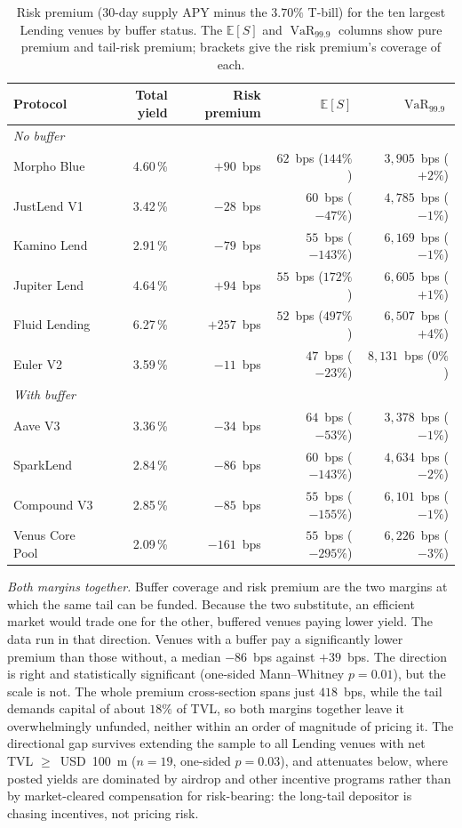 \documentclass[runningheads]{llncs}
\newcommand{\E}{\mathbb{E}}
\newcommand{\VaR}{\operatorname{VaR}}
\begin{document}
\begin{table}[tb]
\centering
\caption{Risk premium (30-day supply APY minus the $3.70\%$ T-bill) for
the ten largest Lending venues by buffer status. The $\E[S]$ and
$\VaR_{99.9}$ columns show pure premium and tail-risk premium; brackets
give the risk premium's coverage of each.}
\label{tab:yield-lending}
\small
\begin{tabular}{l r r r r}
\toprule
Protocol & Total yield & Risk premium & $\E[S]$ & $\VaR_{99.9}$ \\
\midrule
\multicolumn{5}{l}{\emph{No buffer}} \\
Morpho Blue   & 4.60\,\% & $+90$~bps  & $62$~bps ($144\%$)  & $3{,}905$~bps ($+2\%$) \\
JustLend V1   & 3.42\,\% & $-28$~bps  & $60$~bps ($-47\%$)  & $4{,}785$~bps ($-1\%$) \\
Kamino Lend   & 2.91\,\% & $-79$~bps  & $55$~bps ($-143\%$) & $6{,}169$~bps ($-1\%$) \\
Jupiter Lend  & 4.64\,\% & $+94$~bps  & $55$~bps ($172\%$)  & $6{,}605$~bps ($+1\%$) \\
Fluid Lending & 6.27\,\% & $+257$~bps & $52$~bps ($497\%$)  & $6{,}507$~bps ($+4\%$) \\
Euler V2      & 3.59\,\% & $-11$~bps  & $47$~bps ($-23\%$)  & $8{,}131$~bps ($0\%$) \\
\midrule
\multicolumn{5}{l}{\emph{With buffer}} \\
Aave V3         & 3.36\,\% & $-34$~bps  & $64$~bps ($-53\%$)  & $3{,}378$~bps ($-1\%$) \\
SparkLend       & 2.84\,\% & $-86$~bps  & $60$~bps ($-143\%$) & $4{,}634$~bps ($-2\%$) \\
Compound V3     & 2.85\,\% & $-85$~bps  & $55$~bps ($-155\%$) & $6{,}101$~bps ($-1\%$) \\
Venus Core Pool & 2.09\,\% & $-161$~bps & $55$~bps ($-295\%$) & $6{,}226$~bps ($-3\%$) \\
\bottomrule
\end{tabular}
\end{table}

\emph{Both margins together.} Buffer coverage and risk premium are the
two margins at which the same tail can be funded. Because the two
substitute, an efficient market would trade one for the other, buffered
venues paying lower yield. The data run in that direction. Venues with
a buffer pay a significantly lower premium than those without, a median
$-86$~bps against $+39$~bps. The direction is right and statistically
significant (one-sided Mann--Whitney $p=0.01$), but the scale is not.
The whole premium cross-section spans just $418$~bps, while the tail
demands capital of about $18\%$ of TVL, so both margins together leave
it overwhelmingly unfunded, neither within an order of magnitude of
pricing it. The directional gap survives extending the sample to all
Lending venues with net TVL $\ge$~USD~100~m ($n=19$, one-sided
$p=0.03$), and
attenuates below, where posted yields are dominated by airdrop and
other incentive programs rather than by market-cleared compensation for
risk-bearing: the long-tail depositor is chasing incentives, not
pricing risk.
\end{document}
